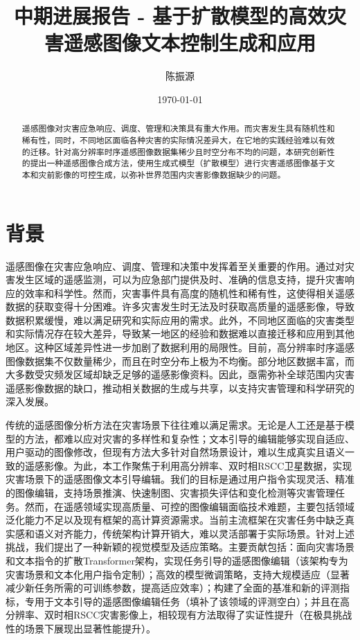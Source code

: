 \documentclass[12pt,a4paper]{article}
\title{中期进展报告 - 基于扩散模型的高效灾害遥感图像文本控制生成和应用}
\author{陈振源}
\date{\today}
\begin{document}
\maketitle

\begin{abstract}
  遥感图像对灾害应急响应、调度、管理和决策具有重大作用。而灾害发生具有随机性和稀有性，同时，不同地区面临各种灾害的实际情况差异大，在它地的实践经验难以有效的迁移。针对高分辨率时序遥感图像数据集稀少且时空分布不均的问题，本研究创新性的提出一种遥感图像合成方法，使用生成式模型（扩散模型）进行灾害遥感图像基于文本和灾前影像的可控生成，以弥补世界范围内灾害影像数据缺少的问题。
\end{abstract}

\section{背景}
遥感图像在灾害应急响应、调度、管理和决策中发挥着至关重要的作用。通过对灾害发生区域的遥感监测，可以为应急部门提供及时、准确的信息支持，提升灾害响应的效率和科学性。然而，灾害事件具有高度的随机性和稀有性，这使得相关遥感数据的获取变得十分困难。许多灾害发生时无法及时获取高质量的遥感影像，导致数据积累缓慢，难以满足研究和实际应用的需求。此外，不同地区面临的灾害类型和实际情况存在较大差异，导致某一地区的经验和数据难以直接迁移和应用到其他地区。这种区域差异性进一步加剧了数据利用的局限性。目前，高分辨率时序遥感图像数据集不仅数量稀少，而且在时空分布上极为不均衡。部分地区数据丰富，而大多数受灾频发区域却缺乏足够的遥感影像资料。因此，亟需弥补全球范围内灾害遥感影像数据的缺口，推动相关数据的生成与共享，以支持灾害管理和科学研究的深入发展。

传统的遥感图像分析方法在灾害场景下往往难以满足需求。无论是人工还是基于模型的方法，都难以应对灾害的多样性和复杂性；文本引导的编辑能够实现自适应、用户驱动的图像修改，但现有方法大多针对自然场景设计，难以生成真实且语义一致的遥感影像。为此，本工作聚焦于利用高分辨率、双时相RSCC卫星数据，实现灾害场景下的遥感图像文本引导编辑。我们的目标是通过用户指令实现灵活、精准的图像编辑，支持场景推演、快速制图、灾害损失评估和变化检测等灾害管理任务。然而，在遥感领域实现高质量、可控的图像编辑面临技术难题，主要包括领域泛化能力不足以及现有框架的高计算资源需求。当前主流框架在灾害任务中缺乏真实感和语义对齐能力，传统架构计算开销大，难以灵活部署于实际场景。针对上述挑战，我们提出了一种新颖的视觉模型及适应策略。主要贡献包括：面向灾害场景和文本指令的扩散Transformer架构，实现任务引导的遥感图像编辑（该架构专为灾害场景和文本化用户指令定制）；高效的模型微调策略，支持大规模适应（显著减少新任务所需的可训练参数，提高适应效率）；构建了全面的基准和新的评测指标，专用于文本引导的遥感图像编辑任务（填补了该领域的评测空白）；并且在高分辨率、双时相RSCC灾害影像上，相较现有方法取得了实证性提升（在极具挑战性的场景下展现出显著性能提升）。
\end{document}
